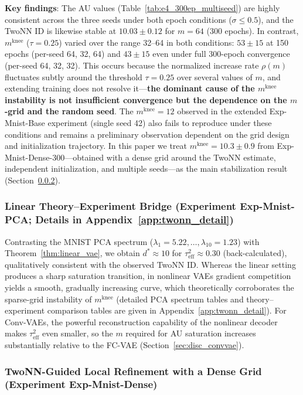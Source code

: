 \documentclass[make,article,submit,pdftex,moreauthors]{Definitions/mdpi}
\newcommand{\mknee}{m^{\mathrm{knee}}}
\begin{document}
\textbf{Key findings}:
The AU values (Table~\ref{tab:e4_300ep_multiseed}) are highly consistent across the three
seeds under both epoch conditions ($\sigma \leq 0.5$), and the TwoNN ID is likewise stable
at $10.03 \pm 0.12$ for $m = 64$ (300 epochs).
In contrast, $\mknee$ ($\tau=0.25$) varied over the range 32--64 in both conditions:
$53 \pm 15$ at 150 epochs (per-seed 64, 32, 64) and $43 \pm 15$ even under full
300-epoch convergence (per-seed 64, 32, 32).
This occurs because the normalized increase rate $\rho(m)$ fluctuates subtly around the
threshold $\tau = 0.25$ over several values of $m$, and extending training does not resolve
it---\textbf{the dominant cause of the $\mknee$ instability is not insufficient convergence
but the dependence on the $m$-grid and the random seed}.
The $\mknee = 12$ observed in the extended Exp-Mnist-Base experiment (single seed 42) also
fails to reproduce under these conditions and remains a preliminary observation dependent
on the grid design and initialization trajectory.
In this paper we treat $\mknee = 10.3 \pm 0.9$ from Exp-Mnist-Dense-300---obtained with a
dense grid around the TwoNN estimate, independent initialization, and multiple
seeds---as the main stabilization result (Section~\ref{sec:exp_el}).

\subsubsection{Linear Theory--Experiment Bridge (Experiment Exp-Mnist-PCA; Details in Appendix~\ref{app:twonn_detail})}\label{sec:exp_em}

Contrasting the MNIST PCA spectrum ($\lambda_1=5.22, \ldots, \lambda_{10}=1.23$) with
Theorem~\ref{thm:linear_vae}, we obtain $d^* \approx 10$ for
$\tau^2_\mathrm{eff} \approx 0.30$ (back-calculated), qualitatively consistent with the
observed TwoNN ID.
Whereas the linear setting produces a sharp saturation transition, in nonlinear VAEs gradient
competition yields a smooth, gradually increasing curve, which theoretically corroborates the
sparse-grid instability of $\mknee$ (detailed PCA spectrum tables and theory--experiment
comparison tables are given in Appendix~\ref{app:twonn_detail}).
For Conv-VAEs, the powerful reconstruction capability of the nonlinear decoder makes
$\tau^2_\mathrm{eff}$ even smaller, so the $m$ required for AU saturation increases
substantially relative to the FC-VAE (Section~\ref{sec:disc_convvae}).

\subsubsection{TwoNN-Guided Local Refinement with a Dense Grid (Experiment Exp-Mnist-Dense)}\label{sec:exp_el}
\end{document}
